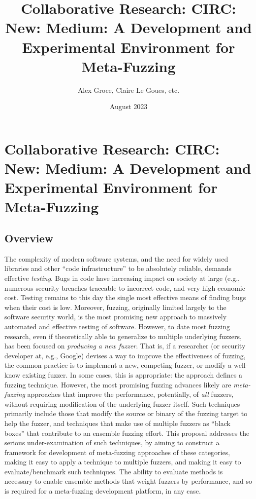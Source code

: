 \documentclass[numbers]{proposalnsf}
\title{Collaborative Research: CIRC: New: Medium: A Development and Experimental Environment for Meta-Fuzzing}
\author{Alex Groce, Claire Le Goues, etc.}
\date{August 2023}
\begin{document}
\section*{Collaborative Research: CIRC: New: Medium: A Development and Experimental Environment for Meta-Fuzzing}

\subsection*{Overview}
\vspace{-2mm}


The complexity of modern software systems, and the need for widely used libraries and other ``code infrastructure'' to be absolutely reliable, demands effective \emph{testing}.  Bugs in code have increasing impact on society at large (e.g., numerous security breaches traceable to incorrect code, and very high economic cost.  Testing remains to this day the single most effective means of finding bugs when their cost is low.   Moreover, fuzzing, originally limited largely to the software security world, is the most promising new approach to massively automated and effective testing of software.   However, to date most fuzzing research, even if theoretically able to generalize to multiple underlying fuzzers, has been focused on \emph{producing a new fuzzer}.  That is, if a researcher (or security developer at, e.g., Google) devises a way to improve the effectiveness of fuzzing, the common practice is to implement a new, competing fuzzer, or modify a well-know existing fuzzer.  In some cases, this is appropriate: the approach defines a fuzzing technique.  However, the most promising fuzzing advances likely are \emph{meta-fuzzing} approaches that improve the performance, potentially, of \emph{all} fuzzers, without requiring modification of the underlying fuzzer itself.  Such techniques primarily include those that modify the source or binary of the fuzzing target to help the fuzzer, and techniques that make use of multiple fuzzers as ``black boxes'' that contribute to an ensemble fuzzing effort.  This proposal addresses the serious under-examination of such techniques, by aiming to construct a framework for development of meta-fuzzing approaches of these categories, making it easy to apply a technique to multiple fuzzers, and making it easy to evaluate/benchmark such techniques.  The ability to evaluate methods is necessary to enable ensemble methods that weight fuzzers by performance, and so is required for a meta-fuzzing development platform, in any case.
\end{document}
